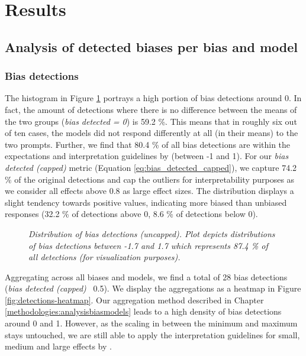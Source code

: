 \section{Results}
\label{chapter:results}

\subsection{Analysis of detected biases per bias and model}
\subsubsection{Bias detections}
\par The histogram in Figure \ref{fig:detections-distribution} portrays a high portion of bias detections around 0. In fact, the amount of detections where there is no difference between the means of the two groups (\textit{bias detected = 0}) is 59.2 \%. This means that in roughly six out of ten cases, the models did not respond differently at all (in their means) to the two prompts. Further, we find that 80.4 \% of all bias detections are within the expectations and interpretation guidelines by \textcite{cohen1988statistical} (between -1 and 1). For our \textit{bias detected (capped)} metric (Equation \ref{eq:bias_detected_capped}), we capture 74.2 \% of the original detections and cap the outliers for interpretability purposes as  we consider all effects above 0.8 as large effect sizes. The distribution displays a slight tendency towards positive values, indicating more biased than unbiased responses (32.2 \% of detections above 0, 8.6 \% of detections below 0).

\begin{figure}[htbp]
    \centering
    
    \caption[Distribution plot of bias detections]{\centering \textit{Distribution of bias detections (uncapped). Plot depicts distributions of bias detections between -1.7 and 1.7 which represents 87.4 \% of all detections (for visualization purposes).}}
    \label{fig:detections-distribution}
\end{figure}

\par Aggregating across all biases and models, we find a total of 28 bias detections (\textit{bias detected (capped)} \geq\, 0.5). We display the aggregations as a heatmap in Figure \ref{fig:detections-heatmap}. Our aggregation method described in Chapter \ref{methodologies:analysisbiasmodels} leads to a high density of bias detections around 0 and 1. However, as the scaling in between the minimum and maximum stays untouched, we are still able to apply the interpretation guidelines for small, medium and large effects by \textcite{cohen1988statistical}.

